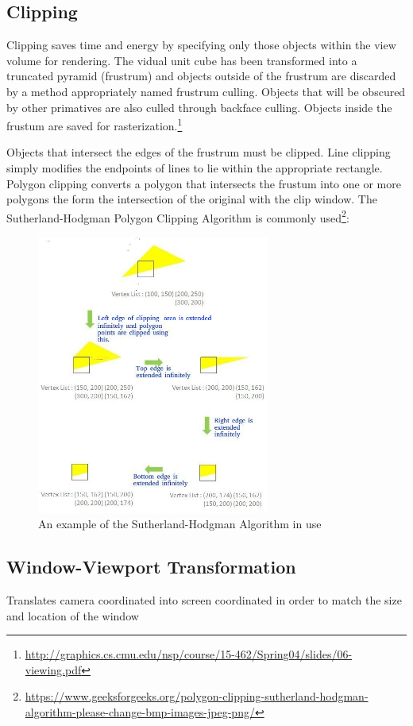\documentclass{article}
\begin{document}
\subsection{Clipping}
Clipping saves time and energy by specifying only those objects within the view volume for rendering. The vidual unit cube has been transformed into a truncated pyramid (frustrum) and objects outside of the frustrum are discarded by a method appropriately named frustrum culling. Objects that will be obscured by other primatives are also culled through backface culling. Objects inside the frustum are saved for rasterization.\footnote{\url{http://graphics.cs.cmu.edu/nsp/course/15-462/Spring04/slides/06-viewing.pdf}}

Objects that intersect the edges of the frustrum must be clipped. Line clipping simply modifies the endpoints of lines to lie within the appropriate rectangle. Polygon clipping converts a polygon that intersects the frustum into one or more polygons the form the intersection of the original with the clip window. The Sutherland-Hodgman Polygon Clipping Algorithm is commonly used\footnote{\url{https://www.geeksforgeeks.org/polygon-clipping-sutherland-hodgman-algorithm-please-change-bmp-images-jpeg-png/}}:

\begin{figure}[H]
    \centering
    \includegraphics[width=3.0in]{Sutherland-Hodgman-Example.jpg}
    \caption{An example of the Sutherland-Hodgman Algorithm in use}
    \label{Sutherland-Hodgman}
\end{figure}

\subsection{Window-Viewport Transformation}
Translates camera coordinated into screen coordinated in order to match the size and location of the window
\end{document}

